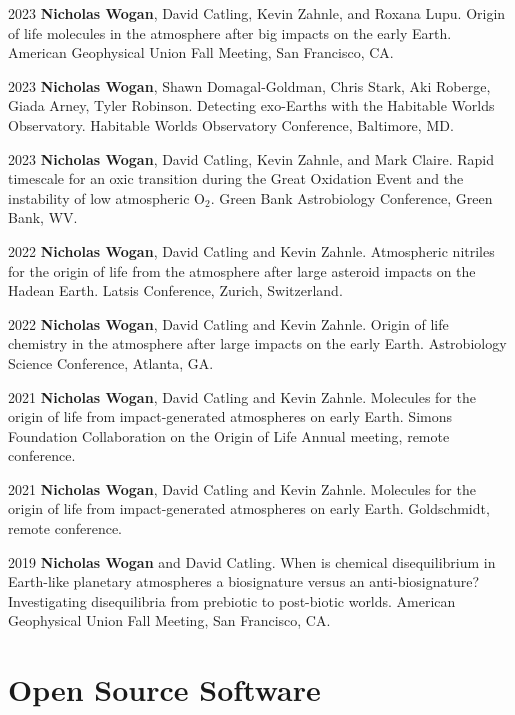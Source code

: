\documentclass{article}
\begin{document}
\begin{cvlist}
\item[2023]
  \textbf{Nicholas Wogan}, David Catling, Kevin Zahnle, and Roxana Lupu. Origin of life molecules in the atmosphere after big impacts on the early Earth. American Geophysical Union Fall Meeting, San Francisco, CA.
\item[2023]
  \textbf{Nicholas Wogan}, Shawn Domagal-Goldman, Chris Stark, Aki Roberge, Giada Arney, Tyler Robinson. Detecting exo-Earths with the Habitable Worlds Observatory. Habitable Worlds Observatory Conference, Baltimore, MD.
\item[2023]
  \textbf{Nicholas Wogan}, David Catling, Kevin Zahnle, and Mark Claire. Rapid timescale for an oxic transition during the Great Oxidation Event and the instability of low atmospheric O$_2$. Green Bank Astrobiology Conference, Green Bank, WV.
\item[2022]
  \textbf{Nicholas Wogan}, David Catling and Kevin Zahnle. Atmospheric nitriles for the origin of life from the atmosphere after large asteroid impacts on the Hadean Earth. Latsis Conference, Zurich, Switzerland.
\item[2022]
  \textbf{Nicholas Wogan}, David Catling and Kevin Zahnle. Origin of life chemistry in the atmosphere after large impacts on the early Earth. Astrobiology Science Conference, Atlanta, GA.
\item[2021]
  \textbf{Nicholas Wogan}, David Catling and Kevin Zahnle. Molecules for the origin of life from impact-generated atmospheres on early Earth. Simons Foundation Collaboration on the Origin of Life Annual meeting, remote conference.
\item[2021]
  \textbf{Nicholas Wogan}, David Catling and Kevin Zahnle. Molecules for the origin of life from impact-generated atmospheres on early Earth. Goldschmidt, remote conference.
\item[2019]
  \textbf{Nicholas Wogan} and David Catling. When is chemical disequilibrium in Earth-like planetary atmospheres a biosignature versus an anti-biosignature? Investigating disequilibria from prebiotic to post-biotic worlds. American Geophysical Union Fall Meeting, San Francisco, CA.
\end{cvlist}

\section{Open Source Software}
\end{document}
